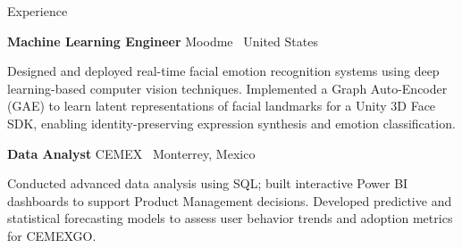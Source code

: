 \begin{rubric}{Experience}

\entry*[10/2023 -- 01/2024]
  \textbf{Machine Learning Engineer} \hfill Moodme \textbar\ United States
  \par
Designed and deployed real-time facial emotion recognition systems using deep learning-based computer vision techniques.
Implemented a Graph Auto-Encoder (GAE) to learn latent representations of facial landmarks for a Unity 3D Face SDK, enabling identity-preserving expression synthesis and emotion classification.


\entry*[04/2023 -- 08/2023]
  \textbf{Data Analyst} \hfill CEMEX \textbar\ Monterrey, Mexico
  \par
Conducted advanced data analysis using SQL; built interactive Power BI dashboards to support Product Management decisions.
Developed predictive and statistical forecasting models to assess user behavior trends and adoption metrics for CEMEXGO.

\end{rubric}

